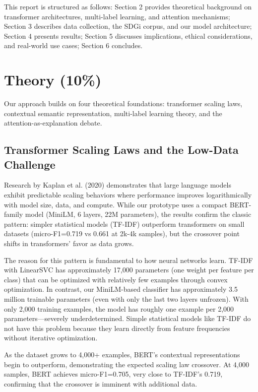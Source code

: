 \documentclass[12pt,a4paper]{article}
\begin{document}
This report is structured as follows: Section 2 provides theoretical background on transformer architectures, multi-label learning, and attention mechanisms; Section 3 describes data collection, the SDGi corpus, and our model architecture; Section 4 presents results; Section 5 discusses implications, ethical considerations, and real-world use cases; Section 6 concludes.

\section{Theory (10\%)}

Our approach builds on four theoretical foundations: transformer scaling laws, contextual semantic representation, multi-label learning theory, and the attention-as-explanation debate.

\subsection{Transformer Scaling Laws and the Low-Data Challenge}

Research by Kaplan et al. (2020) demonstrates that large language models exhibit predictable scaling behaviors where performance improves logarithmically with model size, data, and compute. While our prototype uses a compact BERT-family model (MiniLM, 6 layers, 22M parameters), the results confirm the classic pattern: simpler statistical models (TF-IDF) outperform transformers on small datasets (micro-F1=0.719 vs 0.661 at 2k-4k samples), but the crossover point shifts in transformers' favor as data grows.

The reason for this pattern is fundamental to how neural networks learn. TF-IDF with LinearSVC has approximately 17,000 parameters (one weight per feature per class) that can be optimized with relatively few examples through convex optimization. In contrast, our MiniLM-based classifier has approximately 3.5 million trainable parameters (even with only the last two layers unfrozen). With only 2,000 training examples, the model has roughly one example per 2,000 parameters—severely underdetermined. Simple statistical models like TF-IDF do not have this problem because they learn directly from feature frequencies without iterative optimization.

As the dataset grows to 4,000+ examples, BERT's contextual representations begin to outperform, demonstrating the expected scaling law crossover. At 4,000 samples, BERT achieves micro-F1=0.705, very close to TF-IDF's 0.719, confirming that the crossover is imminent with additional data.
\end{document}
